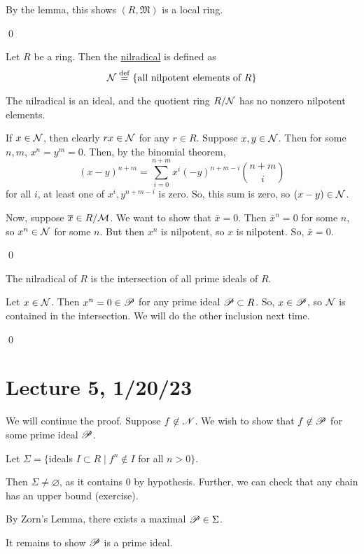 \documentclass[x11names,reqno,14pt]{extarticle}
\newcommand{\mk}[1]{\mathfrak{#1}}
\begin{document}
By the lemma, this shows $(R, \mk{M})$ is a local ring. 

\qed


Let $R$ be a ring. Then the \underline{nilradical} is defined as
\[
\mathcal{N}\overset{\mathrm{def}}{=}\{\text{all nilpotent elements of }R\}
\]

\prop

The nilradical is an ideal, and the quotient ring $R/\mathcal{N}$ has no nonzero nilpotent elements. 

\proof

If $x \in \mathcal{N}$, then clearly $rx \in \mathcal{N}$ for any $r \in R$. Suppose $x, y \in \mathcal{N}$. Then for some $n, m$, $x^n = y^m = 0$. Then, by the binomial theorem, 
\[
(x - y)^{n + m} = \sum_{i=0}^{n + m}x^i(-y)^{n + m - i}{n + m\choose i}
\]
for all $i$, at least one of $x^i, y^{n + m - i}$ is zero. So, this sum is zero, so $(x - y) \in \mathcal{N}$. 

Now, suppose $\overline{x}\in R/\mathcal{M}$. We want to show that $\bar{x} = 0$. Then $\bar{x}^n = 0$ for some $n$, so $x^n \in \mathcal{N}$ for some $n$. But then $x^n$ is nilpotent, so $x$ is nilpotent. So, $\bar{x} = 0$. 

\qed

\prop

The nilradical of $R$ is the intersection of all prime ideals of $R$. 

\proof

Let $x \in \mathcal{N}$. Then $x^n = 0 \in \mathscr{P}$ for any prime ideal $\mathscr{P} \subset R$. So, $x \in \mathscr{P}$, so $\mathcal{N}$ is contained in the intersection. We will do the other inclusion next time. 

\qed

\section*{Lecture 5, 1/20/23}

We will continue the proof. Suppose $f\not\in \mathscr{N}$. We wish to show that $f\not\in\mathscr{P}$ for some prime ideal $\mathscr{P}$. 

Let $\Sigma = \{$ideals $I \subset R \mid f^n\not\in I$ for all $n > 0 \}$.

Then $\Sigma\neq\varnothing$, as it contains $0$ by hypothesis. Further, we can check that any chain has an upper bound (exercise). 

By Zorn's Lemma, there exists a maximal $\mathscr{P}\in\Sigma$. 

It remains to show $\mathscr{P}$ is a prime ideal. 
\end{document}
